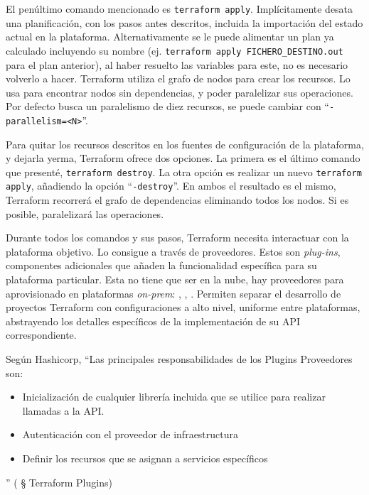 \documentclass[11pt]{article}
\begin{document}
\begin{flushleft}
		El penúltimo comando mencionado es \texttt{terraform apply}. Implícitamente desata una planificación, con los pasos antes descritos, incluida la importación del estado actual en la plataforma. Alternativamente se le puede alimentar un plan ya calculado incluyendo su nombre (ej. \texttt{terraform apply FICHERO\_DESTINO.out} para el plan anterior), al haber resuelto las variables para este, no es necesario volverlo a hacer. Terraform utiliza el grafo de nodos para crear los recursos. Lo usa para encontrar nodos sin dependencias, y poder paralelizar sus operaciones. Por defecto busca un paralelismo de diez recursos, se puede cambiar con ``\texttt{-parallelism=<N>}''.
		\linebreak
		
		Para quitar los recursos descritos en los fuentes de configuración de la plataforma, y dejarla yerma, Terraform ofrece dos opciones. La primera es el último comando que presenté, \texttt{terraform destroy}. La otra opción es realizar un nuevo \texttt{terraform apply}, añadiendo la opción ``\texttt{-destroy}''. En ambos el resultado es el mismo, Terraform recorrerá el grafo de dependencias eliminando todos los nodos. Si es posible, paralelizará las operaciones.
		\linebreak
		
		
		
		Durante todos los comandos y sus pasos, Terraform necesita interactuar con la plataforma objetivo. Lo consigue a través de proveedores. Estos son \textit{plug-ins}, componentes adicionales que añaden la funcionalidad específica para su plataforma particular. Esta no tiene que ser en la nube, hay proveedores para aprovisionado en plataformas \textit{on-prem}: \cite{onprem_provider1}, \cite{onprem_provider2}, \cite{onprem_provider3}. Permiten separar el desarrollo de proyectos Terraform con configuraciones a alto nivel, uniforme entre plataformas, abstrayendo los detalles específicos de la implementación de su API correspondiente.
		\linebreak
		
		Según Hashicorp, ``Las principales responsabilidades de los Plugins Proveedores son:
			\begin{itemize}
				\itemsep0em 
				\item Inicialización de cualquier librería incluida que se utilice para realizar llamadas a la API.
				\item Autenticación con el proveedor de infraestructura
				\item Definir los recursos que se asignan a servicios específicos
			\end{itemize}
		'' (\cite{hashicorp_plugins} § Terraform Plugins)
		\linebreak
		

\end{flushleft}
\end{document}
